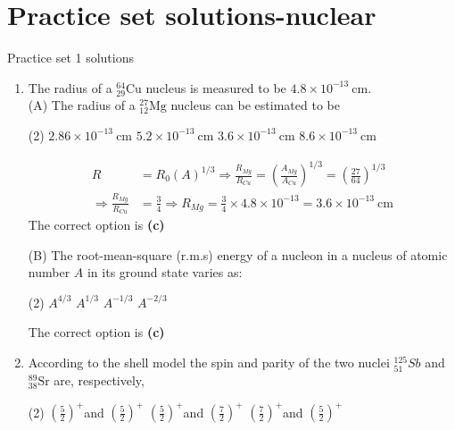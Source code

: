 \chapter{Practice set solutions-nuclear}
\begin{abox}
	Practice set 1 solutions
	\end{abox}
\begin{enumerate}
	\item The radius of a ${ }_{29}^{64} \mathrm{Cu}$ nucleus is measured to be $4.8 \times 10^{-13} \mathrm{~cm}$.
	{}\\
(A) The radius of a ${ }_{12}^{27} \mathrm{Mg}$ nucleus can be estimated to be
\begin{tasks}(2)
	\task[\textbf{A.}] $2.86 \times 10^{-13} \mathrm{~cm}$
	\task[\textbf{B.}]$5.2 \times 10^{-13} \mathrm{~cm}$
	\task[\textbf{C.}] $3.6 \times 10^{-13} \mathrm{~cm}$
	\task[\textbf{D.}]$8.6 \times 10^{-13} \mathrm{~cm}$
\end{tasks}
\begin{answer}
\begin{align*}
R&=R_{0}(A)^{1 / 3} \Rightarrow \frac{R_{M g}}{R_{C u}}=\left(\frac{A_{M g}}{A_{C u}}\right)^{1 / 3}=\left(\frac{27}{64}\right)^{1 / 3}\\
\Rightarrow \frac{R_{M g}}{R_{C u}}&=\frac{3}{4} \Rightarrow R_{M g}=\frac{3}{4} \times 4.8 \times 10^{-13}=3.6 \times 10^{-13} \mathrm{~cm}
\end{align*}
The correct option is \textbf{(c)}	
\end{answer}
(B) The root-mean-square (r.m.s) energy of a nucleon in a nucleus of atomic number $A$ in its ground state varies as:
\begin{tasks}(2)
	\task[\textbf{A.}] $A^{4 / 3}$
	\task[\textbf{B.}]$A^{1 / 3}$
	\task[\textbf{C.}] $A^{-1 / 3}$
	\task[\textbf{D.}] $A^{-2 / 3}$
\end{tasks}
\begin{answer}
	The correct option is \textbf{(c)}
\end{answer}
	\item According to the shell model the spin and parity of the two nuclei ${ }_{51}^{125} S b$ and ${ }_{38}^{89} \mathrm{Sr}$ are, respectively,
	{}\\
\begin{tasks}(2)
	\task[\textbf{A.}] $\left(\frac{5}{2}\right)^{+}$and $\left(\frac{5}{2}\right)^{+}$
	\task[\textbf{B.}]$\left(\frac{5}{2}\right)^{+}$and $\left(\frac{7}{2}\right)^{+}$
	\task[\textbf{C.}]$\left(\frac{7}{2}\right)^{+}$and $\left(\frac{5}{2}\right)^{+}$

\end{tasks}
\end{enumerate}
